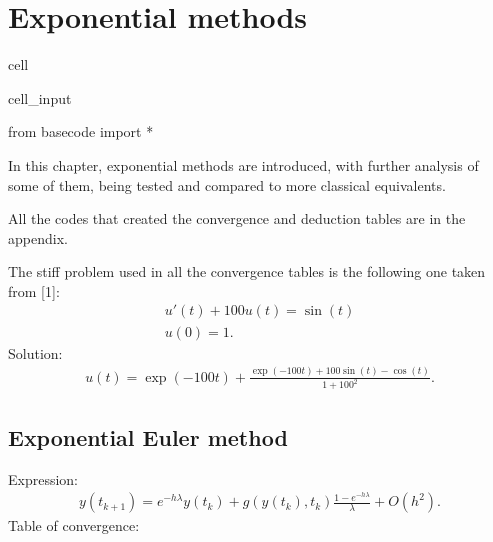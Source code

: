 \documentclass[letterpaper,10pt,english]{jupyterBook}
\begin{document}
\sphinxstepscope


\section{Exponential methods}
\label{\detokenize{cap4:exponential-methods}}\label{\detokenize{cap4::doc}}
\begin{sphinxuseclass}{cell}\begin{sphinxVerbatimInput}

\begin{sphinxuseclass}{cell_input}
\begin{sphinxVerbatim}[commandchars=\\\{\}]
from basecode import *
\end{sphinxVerbatim}

\end{sphinxuseclass}\end{sphinxVerbatimInput}

\end{sphinxuseclass}
\sphinxAtStartPar
In this chapter, exponential methods are introduced, with further analysis of some of them, being tested and compared to more classical equivalents.

\sphinxAtStartPar
All the codes that created the convergence and deduction tables are in the appendix.

\sphinxAtStartPar
The stiff problem used in all the convergence tables is the following one taken from {[}1{]}:
\begin{equation*}
\begin{split}
    u'(t) + 100 u(t) = \sin(t)\\
    u(0) = 1.
\end{split}
\end{equation*}
\sphinxAtStartPar
Solution:
\begin{equation*}
\begin{split}
u(t) = \exp(-100t)+\frac{\exp(-100t)+100\sin(t)-\cos(t)}{1+100^2}.
\end{split}
\end{equation*}

\subsection{Exponential Euler method}
\label{\detokenize{cap4:exponential-euler-method}}
\sphinxAtStartPar
Expression:
\begin{equation*}
\begin{split}
  y(t_{k+1}) = e^{-h \lambda}y(t_k) + g(y(t_k), t_k) \frac{1-e^{-h \lambda}}{\lambda} + O(h^2).
\end{split}
\end{equation*}
\sphinxAtStartPar
Table of convergence:
\end{document}
